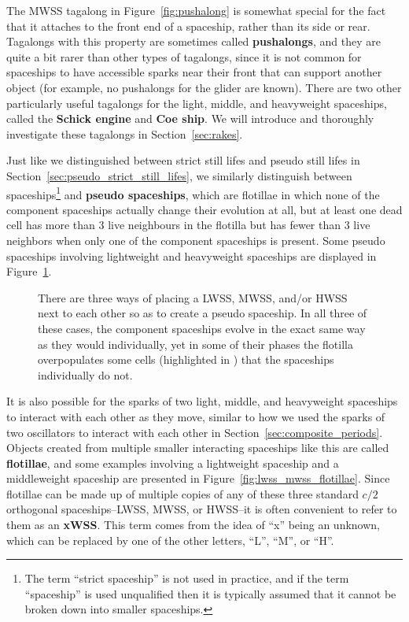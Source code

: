 The MWSS tagalong in Figure~\ref{fig:pushalong} is somewhat special for the fact that it attaches to the front end of a spaceship, rather than its side or rear. Tagalongs with this property are sometimes called \textbf{pushalongs}, and they are quite a bit rarer than other types of tagalongs, since it is not common for spaceships to have accessible sparks near their front that can support another object (for example, no pushalongs for the glider are known). There are two other particularly useful tagalongs for the light, middle, and heavyweight spaceships, called the \textbf{Schick engine} and \textbf{Coe ship}. We will introduce and thoroughly investigate these tagalongs in Section~\ref{sec:rakes}.

Just like we distinguished between strict still lifes and pseudo still lifes in Section~\ref{sec:pseudo_strict_still_lifes}, we similarly distinguish between spaceships\footnote{The term ``strict spaceship'' is not used in practice, and if the term ``spaceship'' is used unqualified then it is typically assumed that it cannot be broken down into smaller spaceships.} and \textbf{pseudo spaceships}, which are flotillae in which none of the component spaceships actually change their evolution at all, but at least one dead cell has more than $3$ live neighbours in the flotilla but has fewer than $3$ live neighbors when only one of the component spaceships is present. Some pseudo spaceships involving lightweight and heavyweight spaceships are displayed in Figure~\ref{fig:lwss_hwss_pseudo}.

\begin{figure}[!htb]
	\centering
	\caption{There are three ways of placing a LWSS, MWSS, and/or HWSS next to each other so as to create a pseudo spaceship. In all three of these cases, the component spaceships evolve in the exact same way as they would individually, yet in some of their phases the flotilla overpopulates some cells (highlighted in ) that the spaceships individually do not.}\label{fig:lwss_hwss_pseudo}
\end{figure}

It is also possible for the sparks of two light, middle, and heavyweight spaceships to interact with each other as they move, similar to how we used the sparks of two oscillators to interact with each other in Section~\ref{sec:composite_periods}. Objects created from multiple smaller interacting spaceships like this are called \textbf{flotillae}, and some examples involving a lightweight spaceship and a middleweight spaceship are presented in Figure~\ref{fig:lwss_mwss_flotillae}. Since flotillae can be made up of multiple copies of any of these three standard $c/2$ orthogonal spaceships--LWSS, MWSS, or HWSS--it is often convenient to refer to them as an \textbf{xWSS}. This term comes from the idea of ``x'' being an unknown, which can be replaced by one of the other letters, ``L'', ``M'', or ``H''.


